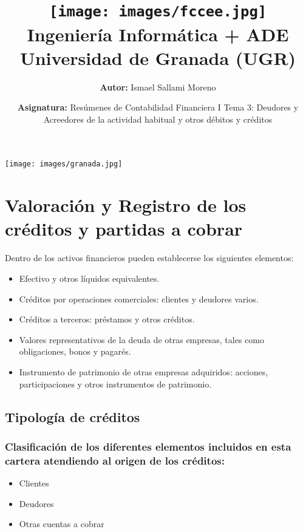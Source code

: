 \documentclass[a4paper,12pt]{article}
\title{
    \vspace{-2cm}
    \texttt{[image: images/fccee.jpg]} \\ %
    \LARGE Ingeniería Informática + ADE\\
    \large Universidad de Granada (UGR)\\[1cm]
}
\author{\textbf{Autor:} Ismael Sallami Moreno}
\date{\textbf{Asignatura:} Resúmenes de Contabilidad Financiera I Tema 3: Deudores y Acreedores de la actividad habitual y otros débitos y créditos}
\begin{document}
\maketitle
\thispagestyle{empty}

\begin{center}
    \texttt{[image: images/granada.jpg]} \\ %
    \vfill
\end{center}

\newpage

\tableofcontents
\newpage

\section{Valoración y Registro de los créditos y partidas a cobrar}

Dentro de los activos financieros pueden establecerse los siguientes elementos: 
\begin{itemize}
    \item Efectivo y otros líquidos equivalentes.
    \item Créditos por operaciones comerciales: clientes y deudores varios.
    \item Créditos a terceros: préstamos y otros créditos.
    \item Valores representativos de la deuda de otras empresas, tales como obligaciones, bonos y pagarés.
    \item Instrumento de patrimonio de otras empresas adquiridos: acciones, participaciones y otros instrumentos de patrimonio.
\end{itemize}

\subsection{Tipología de créditos}

\subsubsection{Clasificación de los diferentes elementos incluidos en esta cartera atendiendo al origen de los créditos:}

\begin{itemize}
    \item Clientes
    \item Deudores
    \item Otras cuentas a cobrar
\end{itemize}
\end{document}
